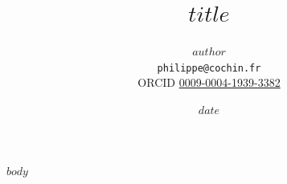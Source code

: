 \documentclass[11pt,a4paper]{article}
\title{$title$}
\author{$author$ \\ \texttt{philippe@cochin.fr} \\
  \small ORCID \href{https://orcid.org/0009-0004-1939-3382}{0009-0004-1939-3382}}
\date{$date$}
\begin{document}
\maketitle
$body$
\end{document}
